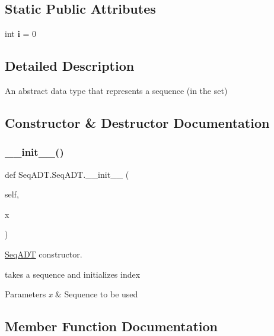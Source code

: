 \subsection*{Static Public Attributes}
\begin{DoxyCompactItemize}
\item 
\mbox{\label{class_seq_a_d_t_1_1_seq_a_d_t_a9835bbeade32b81a6e46cb84eeaece4d}} 
int {\bfseries i} = 0
\end{DoxyCompactItemize}


\subsection{Detailed Description}
An abstract data type that represents a sequence (in the set) 

\subsection{Constructor \& Destructor Documentation}
\mbox{\label{class_seq_a_d_t_1_1_seq_a_d_t_a9330066e7aa744127c86671e1a66e155}} 
\subsubsection{\texorpdfstring{\_\_init\_\_()}{\_\_init\_\_()}}
{\footnotesize\ttfamily def Seq\+A\+D\+T.\+Seq\+A\+D\+T.\+\_\+\+\_\+init\+\_\+\+\_\+ (\begin{DoxyParamCaption}\item[{}]{self,  }\item[{}]{x }\end{DoxyParamCaption})}



\mbox{\hyperlink{class_seq_a_d_t_1_1_seq_a_d_t}{Seq\+A\+DT}} constructor. 

takes a sequence and initializes index 
\begin{DoxyParams}{Parameters}
{\em x} & Sequence to be used \\
\hline
\end{DoxyParams}


\subsection{Member Function Documentation}
\mbox{\label{class_seq_a_d_t_1_1_seq_a_d_t_a7d8df17dae5df548ca32054075ca04b8}} 
